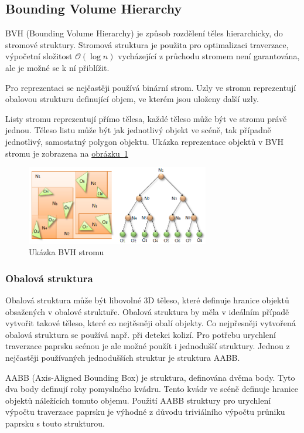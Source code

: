 \documentclass[czech,master]{diploma}
\begin{document}
\subsection{Bounding Volume Hierarchy}
BVH (Bounding Volume Hierarchy) je způsob rozdělení těles hierarchicky, do stromové struktury. Stromová struktura je použita pro optimalizaci traverzace, výpočetní složitost \(\mathcal{O}(\log n)\) vycházející z průchodu stromem není garantována, ale je možné se k ní přiblížit\cite{Meister2018}.\par Pro reprezentaci se nejčastěji používá binární strom. Uzly ve stromu reprezentují obalovou strukturu definující objem, ve kterém jsou uloženy další uzly.\par
Listy stromu reprezentují přímo tělesa, každé těleso může být ve stromu právě jednou. Těleso listu může být jak jednotlivý objekt ve scéně, tak případně jednotlivý, samostatný polygon objektu. Ukázka reprezentace objektů v BVH stromu je zobrazena na \hyperref[fig:bvh]{obrázku~\ref{fig:bvh}}

\begin{figure}[ht]%
  \centering
  \includegraphics[width=8cm]{Figures/bvh.png}%
  \caption{Ukázka BVH stromu~\cite{BVH}}%
  \label{fig:bvh}%
\end{figure}

\subsubsection{Obalová struktura}
Obalová struktura může být libovolné 3D těleso, které definuje hranice objektů obsažených v obalové struktuře. Obalová struktura by měla v ideálním případě vytvořit takové těleso, které co nejtěsněji obalí objekty. Co nejpřesněji vytvořená obalová struktura se používá např. při detekci kolizí. Pro potřebu urychlení traverzace paprsku scénou je ale možné použít i jednodušší struktury. Jednou z nejčastěji používaných jednodušších struktur je struktura AABB.\par
AABB (Axis-Aligned Bounding Box) je struktura, definována dvěma body. Tyto dva body definují rohy pomyslného kvádru. Tento kvádr ve scéně definuje hranice objektů náležících tomuto objemu. Použití AABB struktury pro urychlení výpočtu traverzace paprsku je výhodné z důvodu triviálního výpočtu průniku paprsku s touto strukturou.
\end{document}
